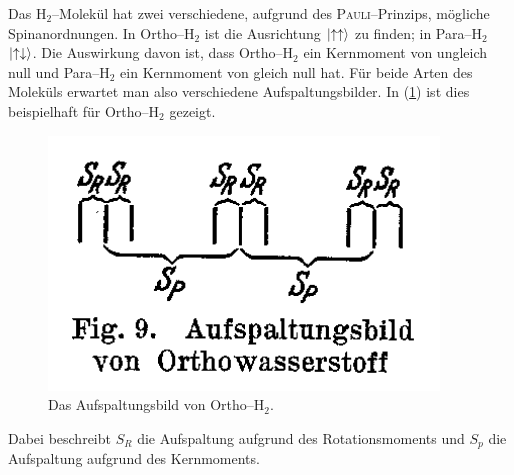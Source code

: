 \documentclass[sn-mathphys-num,iicol]{sn-jnl}
\theoremstyle{thmstyleone}
\theoremstyle{thmstyletwo}
\theoremstyle{thmstylethree}
\begin{document}
Das $\text{H}_2$--Molekül hat zwei verschiedene, aufgrund des \textsc{Pauli}--Prinzips, mögliche Spinanordnungen.
In Ortho--$\text{H}_2$ ist die Ausrichtung $\ket{\uparrow\uparrow}$ zu finden; in Para--$\text{H}_2$ $\ket{\uparrow\downarrow}$.
Die Auswirkung davon ist, dass Ortho--$\text{H}_2$ ein Kernmoment von ungleich null und Para--$\text{H}_2$ ein Kernmoment von gleich null hat.
Für beide Arten des Moleküls erwartet man also verschiedene Aufspaltungsbilder.
In (\ref{fig:ortho_aufspaltung}) ist dies beispielhaft für Ortho--$\text{H}_2$ gezeigt. 
\begin{figure}[h]
        \centering
        \includegraphics[width=.3\textwidth]{../vortrag/prosi_aufspaltungsbild_orthowasserstoff.png}
        \caption{Das Aufspaltungsbild von Ortho--$\text{H}_2$.\cite{FrischStern1933}} \label{fig:ortho_aufspaltung}
\end{figure}
Dabei beschreibt $S_R$ die Aufspaltung aufgrund des Rotationsmoments und $S_p$ die Aufspaltung aufgrund des Kernmoments.
\end{document}
